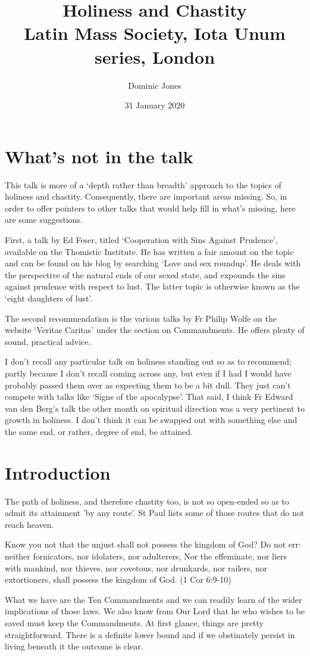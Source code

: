 \documentclass[12pt]{article}
\title{Holiness and Chastity\\ \vspace{5mm} \large{Latin Mass Society, Iota Unum series, London}}
\author{Dominic Jones}
\date{31 January 2020}
\begin{document}
\maketitle

\section*{What's not in the talk}

This talk is more of a `depth rather than breadth' approach to the topics of holiness and chastity. Consequently, there are important areas missing. So, in order to offer pointers to other talks that would help fill in what's missing, here are some suggestions.

First, a talk by Ed Feser, titled `Cooperation with Sins Against Prudence', available on the Thomistic Institute. He has written a fair amount on the topic and can be found on his blog by searching `Love and sex roundup'. He deals with the perspective of the natural ends of our sexed state, and expounds the sins against prudence with respect to lust. The latter topic is otherwise known as the `eight daughters of lust'.

The second recommendation is the various talks by Fr Philip Wolfe on the website `Veritas Caritas' under the section on Commandments. He offers plenty of sound, practical advice.

I don't recall any particular talk on holiness standing out so as to recommend; partly because I don't recall coming across any, but even if I had I would have probably passed them over as expecting them to  be a bit dull. They just can't compete with talks like `Signs of the apocalypse'. That said, I think Fr Edward van den Berg's talk the other month on spiritual direction was a very pertinent to growth in holiness. I don't think it can be swapped out with something else and the same end, or rather, degree of end, be attained.

\section*{Introduction}

The path of holiness, and therefore chastity too, is not so open-ended so as to admit its attainment 'by any route'. St Paul lists some of those routes that do not reach heaven.
\begin{displayquote}
Know you not that the unjust shall not possess the kingdom of God? Do not err: neither fornicators, nor idolaters, nor adulterers, Nor the effeminate, nor liers with mankind, nor thieves, nor covetous, nor drunkards, nor railers, nor extortioners, shall possess the kingdom of God.
(1 Cor 6:9-10)
\end{displayquote}
What we have are the Ten Commandments and we can readily learn of the wider implications of those laws. We also know from Our Lord that he who wishes to be saved must keep the Commandments. At first glance, things are pretty straightforward. There is a definite lower bound and if we obstinately persist in living beneath it the outcome is clear.
\end{document}
